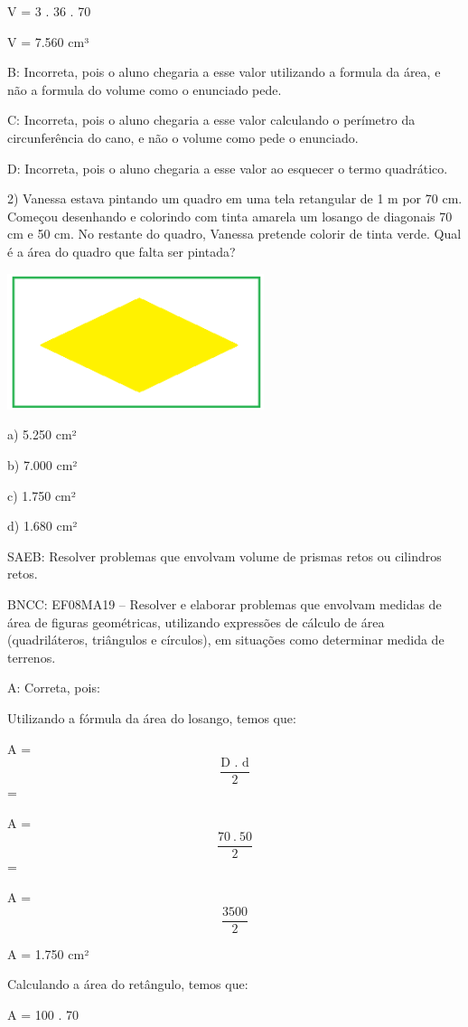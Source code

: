 V = 3 . 36 . 70

V = 7.560 cm³

B: Incorreta, pois o aluno chegaria a esse valor utilizando a formula da
área, e não a formula do volume como o enunciado pede.

C: Incorreta, pois o aluno chegaria a esse valor calculando o perímetro
da circunferência do cano, e não o volume como pede o enunciado.

D: Incorreta, pois o aluno chegaria a esse valor ao esquecer o termo
quadrático.

2) Vanessa estava pintando um quadro em uma tela retangular de 1 m por
70 cm. Começou desenhando e colorindo com tinta amarela um losango de
diagonais 70 cm e 50 cm. No restante do quadro, Vanessa pretende colorir
de tinta verde. Qual é a área do quadro que falta ser pintada?

\includegraphics[width=2.95833in,height=1.56526in]{./imgSAEB_8_MAT/media/image54.png}

a) 5.250 cm²

b) 7.000 cm²

c) 1.750 cm²

d) 1.680 cm²

SAEB: Resolver problemas que envolvam volume de prismas retos ou
cilindros retos.

BNCC: EF08MA19 -- Resolver e elaborar problemas que envolvam medidas de
área de figuras geométricas, utilizando expressões de cálculo de área
(quadriláteros, triângulos e círculos), em situações como determinar
medida de terrenos.

A: Correta, pois:

Utilizando a fórmula da área do losango, temos que:

A = \[\frac{\text{D\ .\ d}}{2}\]=

A = \[\frac{70\ .\ 50}{2}\]=

A = \[\frac{3500}{2}\]

A = 1.750 cm²

Calculando a área do retângulo, temos que:

A = 100 . 70

